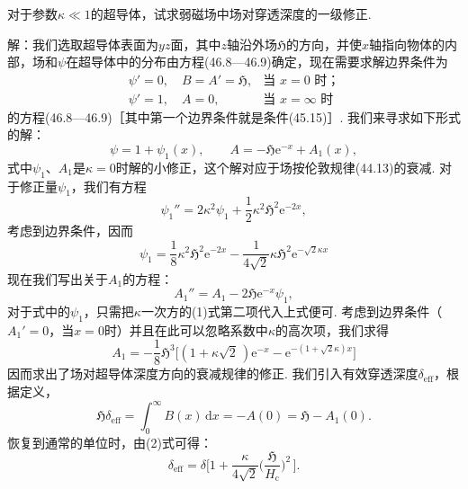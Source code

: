 \begin{xiti}

对于参数$\kappa\ll1$的超导体，试求弱磁场中场对穿透深度的一级修正.

{\heiti 解：}我们选取超导体表面为$yz$面，其中$z$轴沿外场$\mathfrak{H}$的方向，并使$x$轴指向物体的内部，场和$\psi$在超导体中的分布由方程(46.8—46.9)确定，现在需要求解边界条件为
\begin{equation*}
\begin{array}{ll}
\psi'=0,\quad B=A'=\mathfrak{H},&\text{当 }x=0\text{ 时；}\\[0.2em]
\psi'=1,\quad A=0,&\text{当 }x=\infty\text{ 时}
\end{array}
\end{equation*}
的方程(46.8—46.9)［其中第一个边界条件就是条件(45.15)］. 我们来寻求如下形式的解：
\begin{equation*}
\psi=1+\psi_1(x),\qquad A=-\mathfrak{H}\mathrm{e}^{-x}+A_1(x),
\end{equation*}
式中$\psi_1$、$A_1$是$\kappa=0$时解的小修正，这个解对应于场按伦敦规律(44.13)的衰减. 对于修正量$\psi_1$，我们有方程
\begin{equation*}
\psi_1''=2\kappa^2\psi_1+\frac{1}{2}\kappa^2\mathfrak{H}^2\mathrm{e}^{-2x},
\end{equation*}
考虑到边界条件，因而
\begin{equation}\tag{1}
\psi_1=\frac{1}{8}\kappa^2\mathfrak{H}^2\mathrm{e}^{-2x}
-\frac{1}{4\sqrt{2}}\kappa\mathfrak{H}^2\mathrm{e}^{-\sqrt{2}\kappa x}
\end{equation}
现在我们写出关于$A_1$的方程：
\begin{equation*}
A_1''=A_1-2\mathfrak{H}\mathrm{e}^{-x}\psi_1,
\end{equation*}
对于式中的$\psi_1$，只需把$\kappa$一次方的(1)式第二项代入上式便可. 考虑到边界条件（$A_1'=0$，当$x=0$时）并且在此可以忽略系数中$\kappa$的高次项，我们求得
\begin{equation}\tag{2}
A_1=-\frac{1}{8}\mathfrak{H}^3\bigl[(1+\kappa\sqrt{2}\,)\mathrm{e}^{-x}
-\mathrm{e}^{-(1+\sqrt{2}\kappa)x}\bigr]
\end{equation}
因而求出了场对超导体深度方向的衰减规律的修正. 我们引入有效穿透深度$\delta_{\mathrm{eff}}$，根据定义，
\begin{equation*}
\mathfrak{H}\delta_{\mathrm{eff}}=\int_0^{\infty}B(x)\,\mathrm{d}x
=-A(0)=\mathfrak{H}-A_1(0).
\end{equation*}
恢复到通常的单位时，由(2)式可得：
\begin{equation*}
\delta_{\mathrm{eff}}=\delta\biggl[1+\frac{\kappa}{4\sqrt{2}}
\biggl(\frac{\mathfrak{H}}{H_{\mathrm{c}}}\biggr)^{\!2}\,\biggr].
\end{equation*}

\end{xiti}


